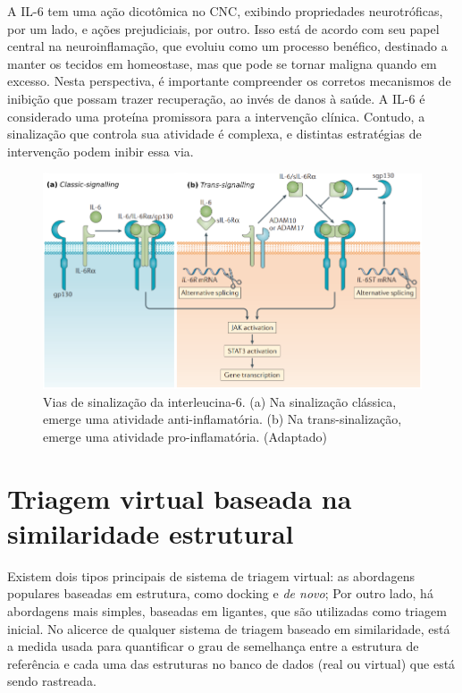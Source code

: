 A IL-6 tem uma ação dicotômica no CNC, exibindo propriedades neurotróficas, por um lado, e ações prejudiciais, por outro. Isso está de acordo com seu papel central na
neuroinflamação, que evoluiu como um processo benéfico, destinado a manter os tecidos em homeostase, mas que pode se tornar maligna quando em excesso. \cite{Spooren2011} Nesta perspectiva, é importante compreender os corretos mecanismos de inibição que possam trazer recuperação, ao invés de danos à saúde. A IL-6 é considerado uma proteína promissora para a intervenção clínica. Contudo, a sinalização que controla sua atividade é complexa, e distintas estratégias de intervenção podem inibir essa via. \cite{Jones2015}


\begin{figure}[H]
\centering
\includegraphics[scale=1]{Figuras/signalling_il6.png}
\caption{Vias de sinalização da interleucina-6. (a) Na sinalização clássica, emerge uma atividade anti-inflamatória. (b) Na trans-sinalização, emerge uma atividade pro-inflamatória. \cite{Johnson2018} (Adaptado)}
\end{figure}

\section{Triagem virtual baseada na similaridade estrutural}

Existem dois tipos principais de sistema de triagem virtual: as abordagens populares baseadas em estrutura, como docking e \textit{de novo}; Por outro lado, há abordagens mais simples, baseadas em ligantes, que são utilizadas como triagem inicial. No alicerce de qualquer sistema de triagem baseado em similaridade, está a medida usada para quantificar o grau de semelhança entre a estrutura de referência e cada uma das estruturas no banco de dados (real ou virtual) que está sendo rastreada. \cite{Willett2006}

